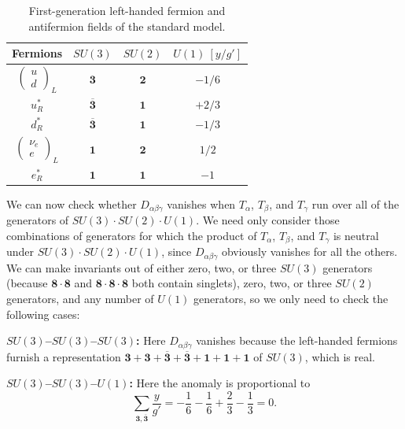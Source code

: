 \begin{table}[htbp]
 \centering
 \begingroup
 \renewcommand{\thetable}{22.1}
 \caption{First-generation left-handed fermion and antifermion fields of
 the standard model.}
 \label{tab:22.1}
 \renewcommand{\arraystretch}{1.35}
 \begin{tabular}{c@{\qquad}c@{\qquad}c@{\qquad}c}
  \hline\hline
  Fermions & $SU(3)$ & $SU(2)$ & $U(1)\ [y/g']$\\
  \hline
  $\begin{pmatrix}u\\ d\end{pmatrix}_{\!L}$
    & $\mathbf 3$ & $\mathbf 2$ & $-1/6$\\
  $u_R^*$ & $\overline{\mathbf 3}$ & $\mathbf 1$ & $+2/3$\\
  $d_R^*$ & $\overline{\mathbf 3}$ & $\mathbf 1$ & $-1/3$\\
  $\begin{pmatrix}\nu_e\\ e\end{pmatrix}_{\!L}$
    & $\mathbf 1$ & $\mathbf 2$ & $1/2$\\
  $e_R^*$ & $\mathbf 1$ & $\mathbf 1$ & $-1$\\
  \hline\hline
 \end{tabular}
 \endgroup
\end{table}

We can now check whether $D_{\alpha\beta\gamma}$ vanishes when $T_\alpha$,
$T_\beta$, and $T_\gamma$ run over all of the generators of
$SU(3)\cdot SU(2)\cdot U(1)$. We need only consider those combinations of
generators for which the product of $T_\alpha$, $T_\beta$, and $T_\gamma$
is neutral under $SU(3)\cdot SU(2)\cdot U(1)$, since
$D_{\alpha\beta\gamma}$ obviously vanishes for all the others. We can make
invariants out of either zero, two, or three $SU(3)$ generators (because
$\mathbf8\cdot\mathbf8$ and
$\mathbf8\cdot\mathbf8\cdot\mathbf8$ both contain singlets), zero, two, or
three $SU(2)$ generators, and any number of $U(1)$ generators, so we only
need to check the following cases:

\noindent\textbf{\boldmath$SU(3)$--$SU(3)$--$SU(3)$:}
Here $D_{\alpha\beta\gamma}$ vanishes because the left-handed fermions
furnish a representation
$\mathbf3+\mathbf3+\overline{\mathbf3}+\overline{\mathbf3}
+\mathbf1+\mathbf1+\mathbf1$ of $SU(3)$, which is real.

\noindent\textbf{\boldmath$SU(3)$--$SU(3)$--$U(1)$:}
Here the anomaly is proportional to
\[
 \sum_{\mathbf3,\overline{\mathbf3}}\frac{y}{g'}
 =-\frac{1}{6}-\frac{1}{6}+\frac{2}{3}-\frac{1}{3}=0.
\]

